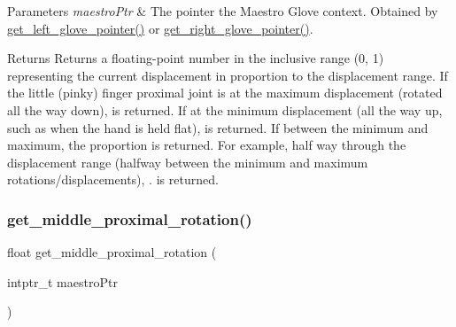 \begin{DoxyParams}{Parameters}
{\em maestro\+Ptr} & The pointer the Maestro Glove context. Obtained by \hyperlink{group__glove_management_ga63ce3c99d4a8b8db851b22af9185764e}{get\+\_\+left\+\_\+glove\+\_\+pointer()} or \hyperlink{group__glove_management_ga9b8fd9d91aeac3f8da50f7a7eba0c32b}{get\+\_\+right\+\_\+glove\+\_\+pointer()}. \\
\hline
\end{DoxyParams}
\begin{DoxyReturn}{Returns}
Returns a floating-\/point number in the inclusive range {\ttfamily (0, 1)} representing the current displacement in proportion to the displacement range. If the little (pinky) finger proximal joint is at the maximum displacement (rotated all the way down), {} is returned. If at the minimum displacement (all the way up, such as when the hand is held flat), {} is returned. If between the minimum and maximum, the proportion is returned. For example, half way through the displacement range (halfway between the minimum and maximum rotations/displacements), {.} is returned. 
\end{DoxyReturn}
\mbox{\label{group__rotation_access_gab9cbb79e5f1b47bd20c079d636b825f0}} 
\subsubsection{\texorpdfstring{get\+\_\+middle\+\_\+proximal\+\_\+rotation()}{get\_middle\_proximal\_rotation()}}
{\footnotesize\ttfamily float get\+\_\+middle\+\_\+proximal\+\_\+rotation (\begin{DoxyParamCaption}\item[{intptr\+\_\+t}]{maestro\+Ptr }\end{DoxyParamCaption})}


